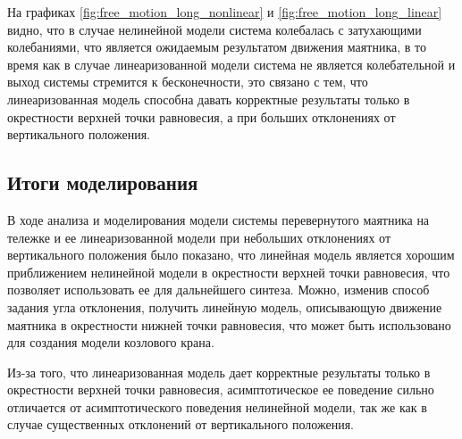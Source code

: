 На графиках \ref{fig:free_motion_long_nonlinear} и \ref{fig:free_motion_long_linear} видно, что
в случае нелинейной модели система колебалась с затухающими колебаниями, что является
ожидаемым результатом движения маятника, в то время как в случае линеаризованной модели система 
не является колебательной и выход системы стремится к бесконечности, это связано с тем, что
линеаризованная модель способна давать корректные результаты только в окрестности 
верхней точки равновесия, а при больших отклонениях от вертикального положения. 

\FloatBarrier
\subsection{Итоги моделирования}
В ходе анализа и моделирования модели системы перевернутого маятника на тележке 
и ее линеаризованной модели при небольших отклонениях от вертикального положения 
было показано, что линейная модель является хорошим приближением нелинейной модели 
в окрестности верхней точки равновесия, что позволяет использовать ее для дальнейшего
синтеза. Можно, изменив способ задания угла отклонения, получить линейную модель, 
описывающую движение маятника в окрестности нижней точки равновесия, что 
может быть использовано для создания модели козлового крана.

Из-за того, что линеаризованная модель дает корректные результаты только в окрестности 
верхней точки равновесия, асимптотическое ее поведение сильно отличается от
асимптотического поведения нелинейной модели, так же как в случае 
существенных отклонений от вертикального положения. 